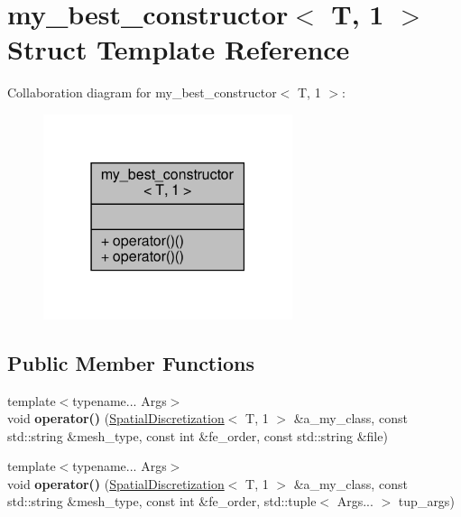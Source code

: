 \hypertarget{structmy__best__constructor_3_01T_00_011_01_4}{}\section{my\+\_\+best\+\_\+constructor$<$ T, 1 $>$ Struct Template Reference}
\label{structmy__best__constructor_3_01T_00_011_01_4}


Collaboration diagram for my\+\_\+best\+\_\+constructor$<$ T, 1 $>$\+:\nopagebreak
\begin{figure}[H]
\begin{center}
\leavevmode
\includegraphics[width=207pt]{structmy__best__constructor_3_01T_00_011_01_4__coll__graph}
\end{center}
\end{figure}
\subsection*{Public Member Functions}
\begin{DoxyCompactItemize}
\item 
\mbox{\label{structmy__best__constructor_3_01T_00_011_01_4_ae7c4c5c43a72d6290f8984531cc87ed4}} 
{\footnotesize template$<$typename... Args$>$ }\\void {\bfseries operator()} (\hyperlink{classSpatialDiscretization}{Spatial\+Discretization}$<$ T, 1 $>$ \&a\+\_\+my\+\_\+class, const std\+::string \&mesh\+\_\+type, const int \&fe\+\_\+order, const std\+::string \&file)
\item 
\mbox{\label{structmy__best__constructor_3_01T_00_011_01_4_a20ac13778a7339bba7c5616f452d80a4}} 
{\footnotesize template$<$typename... Args$>$ }\\void {\bfseries operator()} (\hyperlink{classSpatialDiscretization}{Spatial\+Discretization}$<$ T, 1 $>$ \&a\+\_\+my\+\_\+class, const std\+::string \&mesh\+\_\+type, const int \&fe\+\_\+order, std\+::tuple$<$ Args... $>$ tup\+\_\+args)
\end{DoxyCompactItemize}


